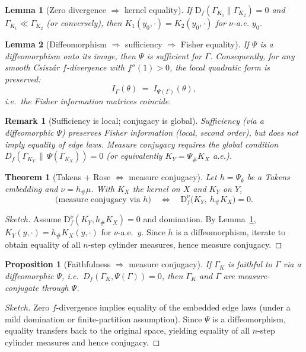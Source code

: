 \documentclass[11pt]{article}
\newtheorem{lemma}{Lemma}
\newtheorem{proposition}{Proposition}
\newtheorem{theorem}{Theorem}
\newtheorem{remark}{Remark}
\newcommand{\Df}{\mathrm{D}_f}
\newcommand{\1}{\mathbf{1}}
\newcommand{\push}{\#}
\begin{document}
\begin{lemma}[Zero divergence $\Rightarrow$ kernel equality]\label{lem:zero}
If \(\Df(\Gamma_{K_1}\|\Gamma_{K_2})=0\) and \(\Gamma_{K_1}\ll \Gamma_{K_2}\) (or conversely), then \(K_1(y_0,\cdot)=K_2(y_0,\cdot)\) for \(\nu\)-a.e. \(y_0\).
\end{lemma}

\begin{lemma}[Diffeomorphism $\Rightarrow$ sufficiency $\Rightarrow$ Fisher equality]
If $\Psi$ is a diffeomorphism onto its image, then $\Psi$ is sufficient for $\Gamma$.
Consequently, for any smooth Csiszár $f$-divergence with $f''(1)>0$, the local quadratic form is preserved:
\[
I_{\Gamma}(\theta) \;=\; I_{\Psi(\Gamma)}(\theta),
\]
i.e.\ the Fisher information matrices coincide.
\end{lemma}

\begin{remark}[Sufficiency is local; conjugacy is global]
Sufficiency (via a diffeomorphic $\Psi$) preserves Fisher information (local, second order), but does \emph{not} imply equality of edge laws.
Measure conjugacy requires the \emph{global} condition $D_f(\Gamma_{K_Y}\,\|\,\Psi(\Gamma_{K_X}))=0$ (or equivalently $K_Y=\Psi_{\push}K_X$ a.e.).
\end{remark}


\begin{theorem}[Takens + Rose $\Longleftrightarrow$ measure conjugacy]\label{thm:bicond}
Let \(h=\Psi_k\) be a Takens embedding and \(\nu=h_\push\mu\). With \(K_X\) the kernel on \(X\) and \(K_Y\) on \(Y\),
\[
\text{(measure conjugacy via }h)\quad\Longleftrightarrow\quad \Df^{\nu}\!\big(K_Y,\ h_\push K_X\big)=0.
\]
\end{theorem}
\begin{proof}[Sketch]
Assume $\Df^{\nu}(K_Y, h_\push K_X)=0$ and domination. By Lemma~\ref{lem:zero}, $K_Y(y,\cdot)= h_\push K_X(y,\cdot)$ for $\nu$-a.e.\ $y$. Since $h$ is a diffeomorphism, iterate to obtain equality of all $n$-step cylinder measures, hence measure conjugacy.
\end{proof}

\begin{proposition}[Faithfulness $\Rightarrow$ measure conjugacy]
If $\Gamma_K$ is faithful to $\Gamma$ via a diffeomorphic $\Psi$, i.e.\ $D_f(\Gamma_K,\Psi(\Gamma))=0$, then $\Gamma_K$ and $\Gamma$ are measure-conjugate through $\Psi$.
\end{proposition}
\begin{proof}[Sketch]
Zero $f$-divergence implies equality of the embedded edge laws (under a mild domination or finite-partition assumption).
Since $\Psi$ is a diffeomorphism, equality transfers back to the original space, yielding equality of all $n$-step cylinder measures and hence conjugacy.
\end{proof}
\end{document}
